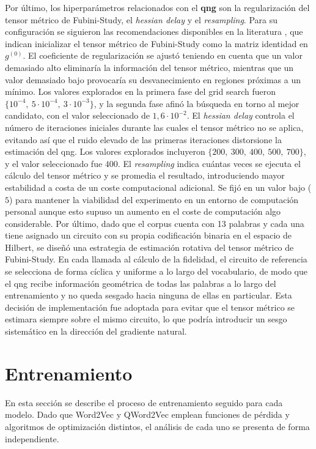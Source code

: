 Por último, los hiperparámetros relacionados con el \textbf{\gls{qng}} son la regularización del tensor métrico de Fubini-Study, el \textit{hessian delay} y el \textit{resampling}. Para su configuración se siguieron las recomendaciones disponibles en la literatura \cite{duan_qnspsa_pennylane_2022}, que indican inicializar el tensor métrico de Fubini-Study como la matriz identidad en $g^{(0)}$. El coeficiente de regularización se ajustó teniendo en cuenta que un valor demasiado alto eliminaría la información del tensor métrico, mientras que un valor demasiado bajo provocaría su desvanecimiento en regiones próximas a un mínimo. Los valores explorados en la primera fase del grid search fueron $\{10^{-4},\ 5 \cdot 10^{-4},\ 3 \cdot 10^{-3}\}$, y la segunda fase afinó la búsqueda en torno al mejor candidato, con el valor seleccionado de $1{,}6 \cdot 10^{-2}$. El \textit{hessian delay} controla el número de iteraciones iniciales durante las cuales el tensor métrico no se aplica, evitando así que el ruido elevado de las primeras iteraciones distorsione la estimación del \gls{qng}. Los valores explorados incluyeron $\{200,\ 300,\ 400,\ 500,\ 700\}$, y el valor seleccionado fue $400$. El \textit{resampling} indica cuántas veces se ejecuta el cálculo del tensor métrico y se promedia el resultado, introduciendo mayor estabilidad a costa de un coste computacional adicional. Se fijó en un valor bajo ($5$) para mantener la viabilidad del experimento en un entorno de computación personal aunque esto supuso un aumento en el coste de computación algo considerable. Por último, dado que el corpus cuenta con 13 palabras y cada una tiene asignado un circuito con su propia codificación binaria en el espacio de Hilbert, se diseñó una estrategia de estimación rotativa del tensor métrico de Fubini-Study. En cada llamada al cálculo de la fidelidad, el circuito de referencia se selecciona de forma cíclica y uniforme a lo largo del vocabulario, de modo que el \gls{qng} recibe información geométrica de todas las palabras a lo largo del entrenamiento y no queda sesgado hacia ninguna de ellas en particular. Esta decisión de implementación fue adoptada para evitar que el tensor métrico se estimara siempre sobre el mismo circuito, lo que podría introducir un sesgo sistemático en la dirección del gradiente natural.

\section{Entrenamiento}

En esta sección se describe el proceso de entrenamiento seguido para cada modelo. Dado que Word2Vec y QWord2Vec emplean funciones de pérdida y algoritmos de optimización distintos, el análisis de cada uno se presenta de forma independiente.

